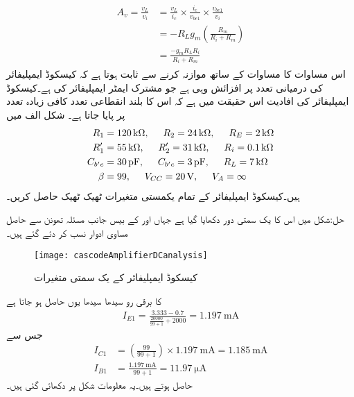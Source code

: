 \begin{gather}
\begin{aligned}
A_v=\frac{v_L}{v_i}&=\frac{v_L}{i_c} \times \frac{i_c}{v_{be1}} \times \frac{v_{be1}}{v_i}\\
&=-R_L g_{m} \left(\frac{R_m}{R_i+R_m}\right)\\
&=\frac{-g_m R_L R_i}{R_i +R_m}
\end{aligned}
\end{gather}
اس مساوات کا مساوات  کے ساتھ موازنہ کرنے سے ثابت ہوتا ہے کہ کیسکوڈ ایمپلیفائر کی درمیانی تعدد پر افزائش وہی ہے جو مشترک ایمٹر ایمپلیفائر کی ہے۔کیسکوڈ ایمپلیفائر کی افادیت اس حقیقت میں ہے کہ اس کا بلند انقطاعی تعدد کافی زیادہ تعدد پر پایا جاتا ہے۔
شکل  الف میں
\begin{align*}
R_1&=\SI{120}{\kilo \ohm}, \hspace{5mm} R_2=\SI{24}{\kilo \ohm}, \hspace{5mm} R_E=\SI{2}{\kilo \ohm}\\
R_1'&=\SI{55}{\kilo \ohm}, \hspace{5mm} R_2'=\SI{31}{\kilo \ohm}, \hspace{5mm} R_i=\SI{0.1}{\kilo \ohm}\\
C_{b'e}&=\SI{30}{\pico \farad}, \hspace{5mm} C_{b'c}=\SI{3}{\pico \farad}, \hspace{5mm} R_L=\SI{7}{\kilo \ohm} \\
\beta&=99, \hspace{5mm} V_{CC}=\SI{20}{\volt}, \hspace{5mm} V_A=\infty 
\end{align*}
ہیں۔کیسکوڈ ایمپلیفائر کے تمام یکمستی متغیرات ٹھیک ٹھیک حاصل کریں۔

حل:شکل  میں اس کا یک سمتی  دور دکھایا گیا ہے جہاں  اور  کے بیس  جانب مسئلہ تھونن  سے حاصل مساوی ادوار نسب کر دئے گئے ہیں۔
\begin{figure}
\centering
\texttt{[image: cascodeAmplifierDCanalysis]}
\caption{کیسکوڈ ایمپلیفائر کے یک سمتی  متغیرات}
\label{شکل_تعددی_ردعمل_کیسکوڈ_ایمپلیفائر_یکسمتی_متغیرات}
\end{figure}

 کا برقی رو سیدھا سیدھا یوں حاصل ہو جاتا ہے
\begin{align}\label{مساوات_تعددی_ردعمل_کیسکوڈ_پہلی_برقی_رو}
I_{E1}=\frac{3.333-0.7}{\frac{20000}{99+1}+2000}=\SI{1.197}{\milli \ampere}
\end{align}
جس سے
\begin{align*}
I_{C1}&=\left(\frac{99}{99+1}\right) \times \SI{1.197}{\milli \ampere}=\SI{1.185}{\milli \ampere}\\
I_{B1}&=\frac{\SI{1.197}{\milli \ampere}}{99+1}=\SI{11.97}{\micro \ampere}
\end{align*}
حاصل ہوتے ہیں۔یہ معلومات شکل پر دکھائی گئی ہیں۔

